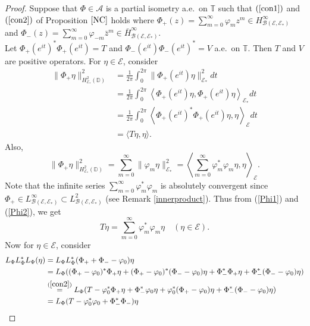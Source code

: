 \documentclass[12pt]{amsart}
\newcommand{\cla}{\mathcal{A}}
\newcommand{\clb}{\mathcal{B}}
\newcommand{\cle}{\mathcal{E}}
\newcommand{\D}{\mathbb{D}}
\newcommand{\T}{\mathbb{T}}
\theoremstyle{definition}
\theoremstyle{plain}
\theoremstyle{definition}
\numberwithin{equation}{section}
\let\phi=\varphi
\begin{document}
\begin{proof}
Suppose that $\Phi \in \cla$ is a partial isometry a.e.\ on $\T$ such that $(\ref{con1})$ and $(\ref{con2})$ of Proposition $\ref{NC}$ holds where $\Phi_+(z)=\sum\limits_{m=0}^\infty \phi_mz^{m} \in H^\infty _{\clb(\cle,\cle_*)}$ and $\Phi_-(z)=\sum\limits_{m=0}^\infty \phi_{-m}\bar{z}^m \in \bar H^\infty_{\clb(\cle,\cle_*)}$.\\
Let $\Phi_+(e^{it})^*\Phi_+(e^{it})=T$ and $\Phi_-(e^{it})\Phi_-(e^{it})^*=V$ a.e.\ on $\T$. Then $T$ and $V$ are positive operators.
For $\eta \in \cle$, consider
\begin{align}
	\| \Phi_+\eta \|^2_{H^2_{\cle_*}(\D)}&=\frac{1}{2\pi}\int_{0}^{2\pi}\|\Phi_+(e^{it})\eta\|^2_{\cle_*} dt \nonumber\\
	&=\frac{1}{2\pi}\int_0^{2\pi}\left\langle \Phi_+(e^{it})\eta,\Phi_+(e^{it})\eta\right\rangle_{\cle_*} dt \nonumber\\
	&=\frac{1}{2\pi}\int_0^{2\pi}\left\langle \Phi_+(e^{it})^*\Phi_+(e^{it})\eta,\eta\right\rangle_{\cle} dt \nonumber\\
	&=\langle T\eta,\eta\rangle. \label{Phi1}
\end{align}
Also,
\begin{equation} \label{Phi2}
	\| \Phi_+\eta \|^2_{H^2_{\cle_*}(\D)}=\sum\limits_{m=0}^\infty \|\phi_m \eta\|^2_{\cle_*}=\left\langle \sum\limits_{m=0}^\infty \phi_m^*\phi_m\eta,\eta \right\rangle_{\cle} .
\end{equation}
Note that the infinite series $\sum\limits_{m=0}^\infty \phi_m^*\phi_m$ is  absolutely convergent since $\Phi_+ \in L^\infty_{\clb(\cle,\cle_*)} \subset L^2_{\clb(\cle,\cle_*)}$ (see Remark \ref{innerproduct}). Thus from (\ref{Phi1}) and (\ref{Phi2}), we get
\begin{equation}\label{Tdef}
T\eta =\sum\limits_{m=0}^\infty \phi_m^*\phi_m\eta \quad (\eta \in \cle) .
\end{equation}
Now for $\eta \in \cle$, consider 
\begin{align*}
L_\Phi L_\Phi^*L_\Phi(\eta) &=L_\Phi L_\Phi^*(\Phi_++\Phi_--\phi_0)\eta\\
 &=L_\Phi((\Phi_+-\phi_0)^*\Phi_+\eta+(\Phi_+-\phi_0)^*(\Phi_--\phi_0)\eta+\Phi_-^*\Phi_+\eta+\Phi_-^*(\Phi_--\phi_0)\eta)\\
 &\stackrel{(\ref{con2})}{=}L_\Phi(T-\phi_0^*\Phi_+\eta+\Phi_-^*\phi_0\eta+\phi_0^*(\Phi_+-\phi_0)\eta+\Phi_-^*(\Phi_--\phi_0)\eta)\\
 &= L_\Phi(T-\phi_0^*\phi_0+\Phi_-^*\Phi_-)\eta\\

\end{align*}
\end{proof}
\end{document}
